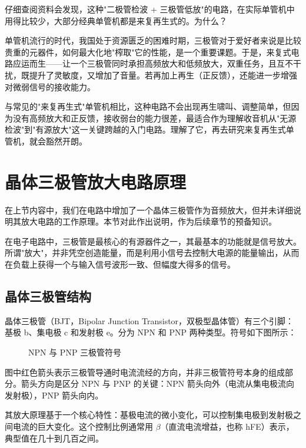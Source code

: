 \documentclass[12pt,UTF8]{ctexbook}
\begin{document}
仔细查阅资料会发现，这种"二极管检波 + 三极管低放"的电路，在实际单管机中用得比较少，大部分经典单管机都是来复再生式的。为什么？

单管机流行的时代，我国处于资源匮乏的困难时期，三极管对于爱好者来说是比较贵重的元器件，如何最大化地"榨取"它的性能，是一个重要课题。于是，来复式电路应运而生——让一个三极管同时承担高频放大和低频放大，双重任务，且互不干扰，既提升了灵敏度，又增加了音量。若再加上再生（正反馈），还能进一步增强对微弱信号的接收能力。

与常见的"来复再生式"单管机相比，这种电路不会出现再生啸叫、调整简单，但因为没有高频放大和正反馈，接收弱台的能力很差，最适合作为理解收音机从"无源检波"到"有源放大"这一关键跨越的入门电路。理解了它，再去研究来复再生式单管机，就会豁然开朗。

\section{晶体三极管放大电路原理}
\label{sec:transistor-amplifier-principle}

在上节内容中，我们在电路中增加了一个晶体三极管作为音频放大，但并未详细说明其放大电路的工作原理。本节对此作出说明，作为后续章节的预备知识。

在电子电路中，三极管是最核心的有源器件之一，其最基本的功能就是信号放大。所谓"放大"，并非凭空创造能量，而是利用小信号去控制大电源的能量输出，从而在负载上获得一个与输入信号波形一致、但幅度大得多的信号。

\subsection{晶体三极管结构}

晶体三极管（BJT，Bipolar Junction Transistor，双极型晶体管）有三个引脚：基极 b、集电极 c 和发射极 e。分为 NPN 和 PNP 两种类型。符号如下图所示：

\begin{figure}[H]
	\centering
	\caption{NPN 与 PNP 三极管符号}
	\label{fig:transistor-symbols}
\end{figure}

图中红色箭头表示三极管导通时电流流经的方向，并非三极管符号本身的组成部分。箭头方向是区分 NPN 与 PNP 的关键：NPN 箭头向外（电流从集电极流向发射极），PNP 箭头向内。

其放大原理基于一个核心特性：基极电流的微小变化，可以控制集电极到发射极之间电流的巨大变化。这个控制比例通常用 $\beta$（直流电流增益，也称 hFE）表示，典型值在几十到几百之间。
\end{document}
